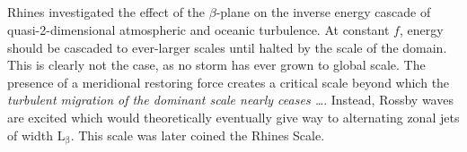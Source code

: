 

\subsection{\citealt{Rhines2006}}\label{sec:hist_rhines}
Rhines investigated the effect of the $\beta$-plane on the inverse energy cascade of quasi-2-dimensional atmospheric and oceanic turbulence. At constant $f$, energy should be cascaded to ever-larger scales until halted by the scale of the domain. This is clearly not the case, as no storm has ever grown to global scale. The presence of a meridional restoring force creates a critical scale beyond which the \textit{turbulent migration of the dominant scale nearly ceases \ldots}. Instead, Rossby waves are excited which would theoretically eventually give way to alternating zonal jets of width $\mathrm{L_{\beta}}$. This scale was later coined the Rhines Scale.




